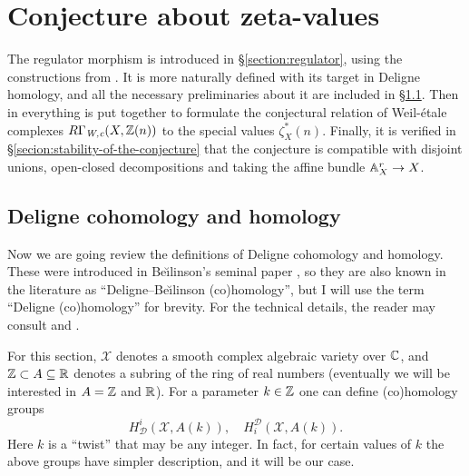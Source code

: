 \chapter{Conjecture about zeta-values}
\label{chapter:regulator}

The regulator morphism is introduced in \S\ref{section:regulator}, using the
constructions from \cite{Kerr-Lewis-Muller-Stach-2006}. It is more naturally
defined with its target in Deligne homology, and all the necessary preliminaries
about it are included in \S\ref{section:deligne-cohomology}.
Then in \label{section:conjecture-C-X-n} everything is put together to formulate
the conjectural relation of Weil-étale complexes
$R\Gamma_\text{\it W,c} (X, \ZZ (n))$ to the special values $\zeta_X^*
(n)$. Finally, it is verified in \S\ref{secion:stability-of-the-conjecture} that
the conjecture is compatible with disjoint unions, open-closed decompositions
and taking the affine bundle $\AA^r_X \to X$.


\section{Deligne cohomology and homology}
\label{section:deligne-cohomology}

Now we are going review the definitions of Deligne cohomology and
homology. These were introduced in Be\u{\i}linson's seminal paper
\cite{Beilinson-1984}, so they are also known in the literature as
``Deligne--Be\u{\i}linson (co)homology'', but I will use the term ``Deligne
(co)homology'' for brevity. For the technical details, the reader may consult
\cite{Esnault-Viehweg} and \cite{Jannsen-Homology}.

\vspace{1em}

For this section, $\mathcal{X}$ denotes a smooth complex algebraic variety over
$\CC$, and $\ZZ \subset A \subseteq \RR$ denotes a subring of the ring of real
numbers (eventually we will be interested in $A = \ZZ$ and $\RR$). For a
parameter $k\in\ZZ$ one can define (co)homology groups
\[ H^i_\mathcal{D} (\mathcal{X}, A (k)), \quad
  H_i^\mathcal{D} (\mathcal{X}, A (k)). \]
Here $k$ is a ``twist'' that may be any integer. In fact, for certain values of
$k$ the above groups have simpler description, and it will be our case.

